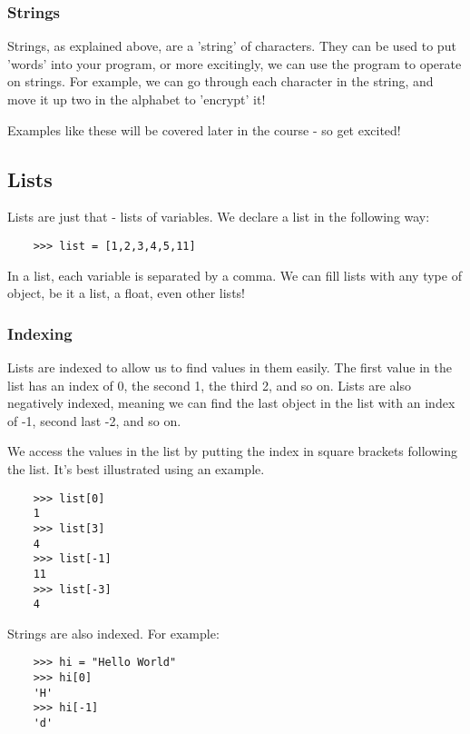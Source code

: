 \subsubsection{Strings}

Strings, as explained above, are a 'string' of characters. They can be used to
put 'words' into your program, or more excitingly, we can use the program to
operate on strings. For example, we can go through each character in the string,
and move it up two in the alphabet to 'encrypt' it!

Examples like these will be covered later in the course - so get excited!

\subsection{Lists}

Lists are just that - lists of variables. We declare a list in the following
way:

\begin{lstlisting}
    >>> list = [1,2,3,4,5,11]
\end{lstlisting}

In a list, each variable is separated by a comma. We can fill lists with any
type of object, be it a list, a float, even other lists!

\subsubsection{Indexing}

Lists are indexed to allow us to find values in them easily. The first value in
the list has an index of 0, the second 1, the third 2, and so on. Lists are also
negatively indexed, meaning we can find the last object in the list with an
index of -1, second last -2, and so on.

We access the values in the list by putting the index in square brackets
following the list. It's best illustrated using an example.

\begin{lstlisting}
    >>> list[0]
    1
    >>> list[3]
    4
    >>> list[-1]
    11
    >>> list[-3]
    4
\end{lstlisting}

Strings are also indexed. For example:

\begin{lstlisting}
    >>> hi = "Hello World"
    >>> hi[0]
    'H'
    >>> hi[-1]
    'd'
\end{lstlisting}

